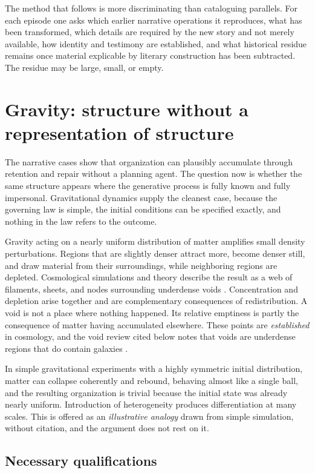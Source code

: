 \documentclass[11pt]{article}
\begin{document}
The method that follows is more discriminating than cataloguing parallels. For each episode one asks which earlier narrative operations it reproduces, what has been transformed, which details are required by the new story and not merely available, how identity and testimony are established, and what historical residue remains once material explicable by literary construction has been subtracted. The residue may be large, small, or empty.

\section{Gravity: structure without a representation of structure}

The narrative cases show that organization can plausibly accumulate through retention and repair without a planning agent. The question now is whether the same structure appears where the generative process is fully known and fully impersonal. Gravitational dynamics supply the cleanest case, because the governing law is simple, the initial conditions can be specified exactly, and nothing in the law refers to the outcome.

Gravity acting on a nearly uniform distribution of matter amplifies small density perturbations. Regions that are slightly denser attract more, become denser still, and draw material from their surroundings, while neighboring regions are depleted. Cosmological simulations and theory describe the result as a web of filaments, sheets, and nodes surrounding underdense voids \cite{bond}. Concentration and depletion arise together and are complementary consequences of redistribution. A void is not a place where nothing happened. Its relative emptiness is partly the consequence of matter having accumulated elsewhere. These points are \emph{established} in cosmology, and the void review cited below notes that voids are underdense regions that do contain galaxies \cite{vdw}.

In simple gravitational experiments with a highly symmetric initial distribution, matter can collapse coherently and rebound, behaving almost like a single ball, and the resulting organization is trivial because the initial state was already nearly uniform. Introduction of heterogeneity produces differentiation at many scales. This is offered as an \emph{illustrative analogy} drawn from simple simulation, without citation, and the argument does not rest on it.

\subsection{Necessary qualifications}
\end{document}

